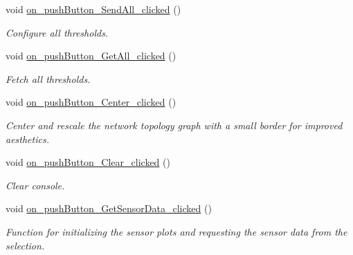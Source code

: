 \begin{DoxyCompactItemize}
void \hyperlink{classMainWindow_abb4b4fb07a781d7e69e97be136406895}{on\+\_\+push\+Button\+\_\+\+Send\+All\+\_\+clicked} ()
\begin{DoxyCompactList}\small\item\em Configure all thresholds. \end{DoxyCompactList}\item 
\mbox{\label{classMainWindow_a286fcb906abc360a3b51626bdc549122}} 
void \hyperlink{classMainWindow_a286fcb906abc360a3b51626bdc549122}{on\+\_\+push\+Button\+\_\+\+Get\+All\+\_\+clicked} ()
\begin{DoxyCompactList}\small\item\em Fetch all thresholds. \end{DoxyCompactList}\item 
\mbox{\label{classMainWindow_aeceef6b26d35f48752f5c95f529b4166}} 
void \hyperlink{classMainWindow_aeceef6b26d35f48752f5c95f529b4166}{on\+\_\+push\+Button\+\_\+\+Center\+\_\+clicked} ()
\begin{DoxyCompactList}\small\item\em Center and rescale the network topology graph with a small border for improved aesthetics. \end{DoxyCompactList}\item 
\mbox{\label{classMainWindow_ab753cd6f5aa04ec2716b23da14a17c3a}} 
void \hyperlink{classMainWindow_ab753cd6f5aa04ec2716b23da14a17c3a}{on\+\_\+push\+Button\+\_\+\+Clear\+\_\+clicked} ()
\begin{DoxyCompactList}\small\item\em Clear console. \end{DoxyCompactList}\item 
\mbox{\label{classMainWindow_a19288f19ebf126204a575b7a71f73ef0}} 
void \hyperlink{classMainWindow_a19288f19ebf126204a575b7a71f73ef0}{on\+\_\+push\+Button\+\_\+\+Get\+Sensor\+Data\+\_\+clicked} ()
\begin{DoxyCompactList}\small\item\em Function for initializing the sensor plots and requesting the sensor data from the selection. \end{DoxyCompactList}\item 
\mbox{\label{classMainWindow_a4c69446fb6a0d787f8901333eec2ce3a}} 

\end{DoxyCompactItemize}
